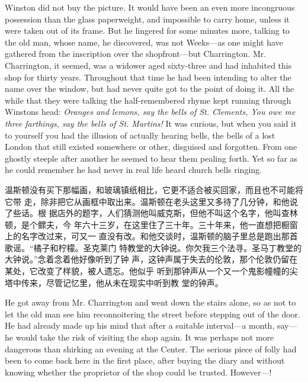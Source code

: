 \begin{paracol}{2}
Winston did not buy the picture. It would have been an even more
incongruous possession than the glass paperweight, and impossible to
carry home, unless it were taken out of its frame. But he lingered for
some minutes more, talking to the old man, whose name, he discovered,
was not Weeks---as one might have gathered from the inscription over the
shopfront---but Charrington. Mr. Charrington, it seemed, was a widower
aged sixty-three and had inhabited this shop for thirty years.
Throughout that time he had been intending to alter the name over the
window, but had never quite got to the point of doing it. All the while
that they were talking the half-remembered rhyme kept running through
Winston\textquotesingle s head: \emph{Oranges and lemons, say the bells
of St. Clement\textquotesingle s, You owe me three farthings, say the
bells of St. Martin\textquotesingle s!} It was curious, but when you
said it to yourself you had the illusion of actually hearing bells, the
bells of a lost London that still existed somewhere or other, disguised
and forgotten. From one ghostly steeple after another he seemed to hear
them pealing forth. Yet so far as he could remember he had never in real
life heard church bells ringing.

\switchcolumn

温斯顿没有买下那幅画，和玻璃镇纸相比，它更不适合被买回家，而且也不可能将它带
走，除非把它从画框中取出来。温斯顿在老头这里又多待了几分钟，和他说了些话。根
据店外的题字，人们猜测他叫威克斯，但他不叫这个名字，他叫查林顿，是个鳏夫，今
年六十三岁，在这里住了三十年。三十年来，他一直想把橱窗上的名字改过来，可又一
直没有改。和他交谈时，温斯顿的脑子里总是跑出那首歌谣。``橘子和柠檬。圣克莱门
特教堂的大钟说。你欠我三个法寻。圣马丁教堂的大钟说。''念着念着他好像听到了钟
声，这钟声属于失去的伦敦，那个伦敦仍留在某处，它改变了样貌，被人遗忘。他似乎
听到那钟声从一个又一个鬼影幢幢的尖塔中传来，尽管记忆里，他从未在现实中听到教
堂的钟声。

\switchcolumn*

He got away from Mr. Charrington and went down the stairs alone, so as
not to let the old man see him reconnoitering the street before stepping
out of the door. He had already made up his mind that after a suitable
interval---a month, say---he would take the risk of visiting the shop
again. It was perhaps not more dangerous than shirking an evening at the
Center. The serious piece of folly had been to come back here in the
first place, after buying the diary and without knowing whether the
proprietor of the shop could be trusted. However---!


\end{paracol}
